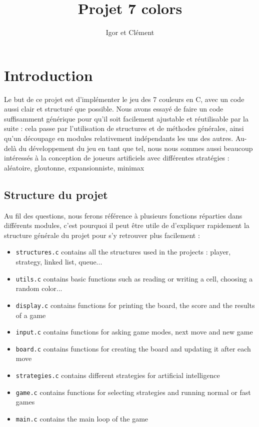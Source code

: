 \documentclass[12pt,L,fira-sans]{paper}
\title{Projet 7 colors}
\author{Igor \maj{Martayan} et Clément \maj{Morand}}
\begin{document}
\maketitle

\section*{Introduction}

Le but de ce projet est d'implémenter le jeu des 7 couleurs en C, avec un code aussi clair et structuré que possible.
Nous avons essayé de faire un code suffisamment générique pour qu'il soit facilement ajustable et réutilisable par la suite : cela passe par l'utilisation de structures et de méthodes générales, ainsi qu'un découpage en modules relativement indépendants les uns des autres.
Au-delà du développement du jeu en tant que tel, nous nous sommes aussi beaucoup intéressés à la conception de joueurs artificiels avec différentes stratégies : aléatoire, gloutonne, expansionniste, minimax\etc

\subsection*{Structure du projet}

Au fil des questions, nous ferons référence à plusieurs fonctions réparties dans différents modules, c'est pourquoi il peut être utile de d'expliquer rapidement la structure générale du projet pour s'y retrouver plus facilement :

\begin{itemize}
	\item \verb|structures.c| contains all the structures used in the projects : player, strategy, linked list, queue...
	\item \verb|utils.c| contains basic functions such as reading or writing a cell, choosing a random color...
	\item \verb|display.c| contains functions for printing the board, the score and the results of a game
	\item \verb|input.c| contains functions for asking game modes, next move and new game
	\item \verb|board.c| contains functions for creating the board and updating it after each move
	\item \verb|strategies.c| contains different strategies for artificial intelligence
	\item \verb|game.c| contains functions for selecting strategies and running normal or fast games
	\item \verb|main.c| contains the main loop of the game
\end{itemize}
\end{document}
